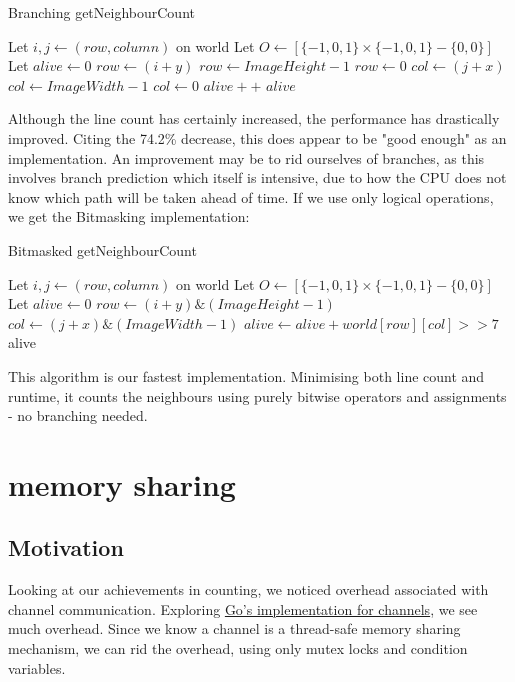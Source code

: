 \documentclass[twoside,twocolumn]{article}
\begin{document}
\begin{algorithm}
  \caption{Branching getNeighbourCount}
  \begin{algorithmic}
    \State Let $i, j \gets (row, column)$ on world
  \State Let $O \gets [\{-1,0,1\} \times \{-1, 0, 1\} - \{0,0\}]$
  \State Let $alive \gets 0$   
      \State $row \gets (i + y)$
        \State $row \gets ImageHeight-1$
        \State $row \gets 0$
      \EndIf
      \State $col \gets (j + x)$
        \State $col \gets ImageWidth - 1$
          \State $col \gets 0$
      \EndIf
      \State $alive++$
      \EndIf
    \EndFor
    \State \Return $alive$
  \end{algorithmic}
\end{algorithm}
Although the line count has certainly increased, the performance has drastically improved. Citing the 
74.2\% decrease, this does appear to be "good enough" as an implementation. An improvement may be to rid 
ourselves of branches, as this involves branch prediction which itself is intensive, due to how the CPU 
does not know which path will be taken ahead of time. If we use only logical operations,
we get the Bitmasking implementation:
\begin{algorithm}
  \caption{Bitmasked getNeighbourCount}
  \begin{algorithmic}
    \State Let $i, j \gets (row, column)$ on world
  \State Let $O \gets [\{-1,0,1\} \times \{-1, 0, 1\} - \{0,0\}]$
  \State Let $alive \gets 0$   
      \State $row \gets (i + y) \& (ImageHeight - 1)$
      \State $col \gets (j + x) \& (ImageWidth - 1)$
      \State $alive \gets alive + world[row][col] >> 7$
    \EndFor
    \State \Return alive
  \end{algorithmic}
\end{algorithm}

This algorithm is our fastest implementation. Minimising both line count and runtime, it 
counts the neighbours using purely bitwise operators and assignments - no branching needed.


\section{memory sharing}
\subsection{Motivation}
Looking at our achievements in counting, we noticed overhead associated with channel communication.
Exploring \href{https://github.com/golang/go/blob/4fc9565ffce91c4299903f7c17a275f0786734a1/src/runtime/chan.go}
{Go's implementation for channels}, we see much overhead. Since we know a channel is a thread-safe memory sharing
mechanism, we can rid the overhead, using only mutex locks and condition variables.
\end{document}
